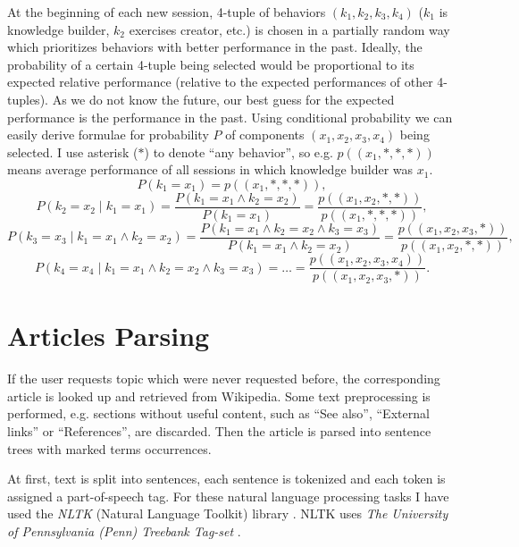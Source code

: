 \documentclass[12pt, twoside]{fithesis2}
\renewcommand{\_}{\leavevmode \kern0.07em\vbox{\hrule width0.4em}}
\begin{document}
At the beginning of each new session, 4-tuple of behaviors $(k_1, k_2, k_3, k_4)$ ($k_1$ is knowledge builder, $k_2$ exercises creator, etc.) is chosen in a partially random way
which prioritizes behaviors with better performance in the past.
Ideally, the probability of a certain 4-tuple being selected would be proportional to its expected relative performance
(relative to the expected performances of other 4-tuples).
As we do not know the future, our best guess for the expected performance is the performance in the past.
Using conditional probability we can easily derive formulae for probability $P$ of components $(x_1, x_2, x_3, x_4)$ being selected.
I use asterisk ($*$) to denote ``any behavior'', so e.g. $p((x_1, *, *, *))$ means average performance of all sessions in which knowledge builder was $x_1$.
$$
P(k_1 = x_1) = p((x_1, *, *, *)),
$$
$$
P(k_2 = x_2 \mid k_1 = x_1)
  = \frac{P(k_1 = x_1 \land k_2 = x_2)}{P(k_1 = x_1)}
  = \frac{p((x_1, x_2, *, *))}{p((x_1, *, *, *))},
$$
$$
P(k_3 = x_3 \mid k_1 = x_1 \land k_2 = x_2)
  = \frac{P(k_1 = x_1 \land k_2 = x_2 \land k_3 = x_3)}{P(k_1 = x_1 \land k_2 = x_2)}
  = \frac{p((x_1, x_2, x_3, *))}{p((x_1, x_2, *, *))},
$$
$$
P(k_4 = x_4 \mid k_1 = x_1 \land k_2 = x_2 \land k_3 = x_3)
  = \ldots
  = \frac{p((x_1, x_2, x_3, x_4))}{p((x_1, x_2, x_3, *))}.
$$



\section{Articles Parsing}
\label{sec:articles-parsing}

If the user requests topic which were never requested before,
the corresponding article is looked up and retrieved from Wikipedia.
Some text preprocessing is performed, e.g. sections without useful content, such as ``See also'', ``External links'' or ``References'', are discarded.
Then the article is parsed into sentence trees with marked terms occurrences.

At first, text is split into sentences, each sentence is tokenized
and each token is assigned a part-of-speech tag.
    For these natural language processing tasks I have used the \textit{NLTK} (Natural Language Toolkit) library \cite{nlp-python}. NLTK uses \textit{The University of Pennsylvania (Penn) Treebank Tag-set} \cite{penn-tagset}.
\end{document}
